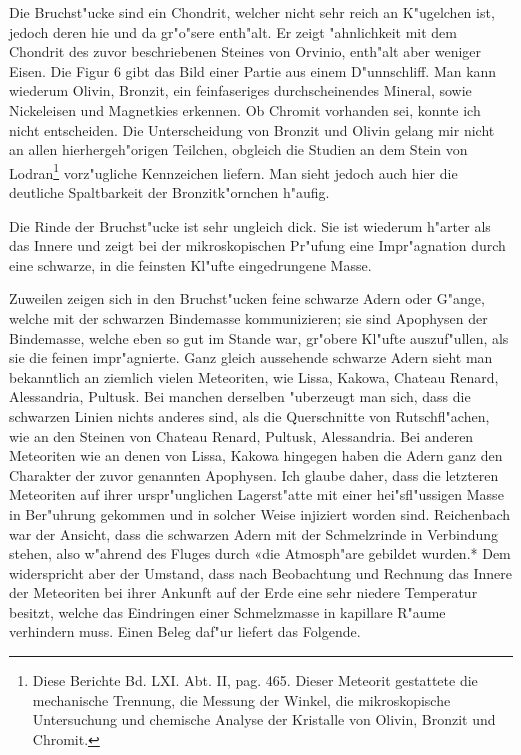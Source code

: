 \documentclass[a4paper, 11pt, oneside]{article}
\begin{document}
Die Bruchst"ucke sind ein Chondrit, welcher nicht sehr reich an K"ugelchen ist, jedoch deren hie und da gr"o"sere enth"alt. Er zeigt "ahnlichkeit mit dem Chondrit des zuvor beschriebenen Steines von Orvinio, enth"alt aber weniger Eisen. Die Figur 6 gibt das Bild einer Partie aus einem D"unnschliff. Man kann wiederum Olivin, Bronzit, ein feinfaseriges durchscheinendes Mineral, sowie Nickeleisen und Magnetkies erkennen. Ob Chromit vorhanden sei, konnte ich nicht entscheiden. Die Unterscheidung von Bronzit und Olivin gelang mir nicht an allen hierhergeh"origen Teilchen, obgleich die Studien an dem Stein von Lodran\footnote{Diese Berichte Bd. LXI. Abt. II, pag. 465. Dieser Meteorit gestattete die mechanische Trennung, die Messung der Winkel, die mikroskopische Untersuchung und chemische Analyse der Kristalle von Olivin, Bronzit und Chromit.} vorz"ugliche Kennzeichen liefern. Man sieht jedoch auch hier die deutliche Spaltbarkeit der Bronzitk"ornchen h"aufig.

Die Rinde der Bruchst"ucke ist sehr ungleich dick. Sie ist wiederum h"arter als das Innere und zeigt bei der mikroskopischen Pr"ufung eine Impr"agnation durch eine schwarze, in die feinsten Kl"ufte eingedrungene Masse.

Zuweilen zeigen sich in den Bruchst"ucken feine schwarze Adern oder G"ange, welche mit der schwarzen Bindemasse kommunizieren; sie sind Apophysen der Bindemasse, welche eben so gut im Stande war, gr"obere Kl"ufte auszuf"ullen, als sie die feinen impr"agnierte. Ganz gleich aussehende schwarze Adern sieht man bekanntlich an ziemlich vielen Meteoriten, wie Lissa, Kakowa, Chateau Renard, Alessandria, Pultusk. Bei manchen derselben "uberzeugt man sich, dass die schwarzen Linien nichts anderes sind, als die Querschnitte von Rutschfl"achen, wie an den Steinen von Chateau Renard, Pultusk, Alessandria. Bei anderen Meteoriten wie an denen von Lissa, Kakowa hingegen haben die Adern ganz den Charakter der zuvor genannten Apophysen. Ich glaube daher, dass die letzteren Meteoriten auf ihrer urspr"unglichen Lagerst"atte mit einer hei"sfl"ussigen Masse in Ber"uhrung gekommen und in solcher Weise injiziert worden sind. Reichenbach war der Ansicht, dass die schwarzen Adern mit der Schmelzrinde in Verbindung stehen, also w"ahrend des Fluges durch «die Atmosph"are gebildet wurden.* Dem widerspricht aber der Umstand, dass nach Beobachtung und Rechnung das Innere der Meteoriten bei ihrer Ankunft auf der Erde eine sehr niedere Temperatur besitzt, welche das Eindringen einer Schmelzmasse in kapillare R"aume verhindern muss. Einen Beleg daf"ur liefert das Folgende.
\end{document}
